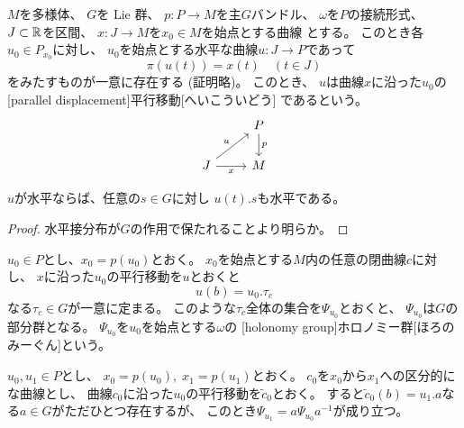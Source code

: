 \documentclass[report]{jlreq}
\begin{document}
\begin{definition}[平行移動]
    $M$を多様体、
    $G$を Lie 群、
    $p \colon P \to M$を主$G$バンドル、
    $\omega$を$P$の接続形式、
    $J \subset \mathbb{R}$を区間、
    $x \colon J \to M$を$x_0 \in M$を始点とする{\smooth}曲線
    とする。
    このとき各$u_0 \in P_{x_0}$に対し、
    $u_0$を始点とする水平な{\smooth}曲線$u \colon J \to P$であって
    \begin{equation}
        \pi(u(t)) = x(t) \quad (t \in J)
    \end{equation}
    をみたすものが一意に存在する (証明略)。
    このとき、
    $u$は曲線$x$に沿った$u_0$の
    [parallel displacement]{平行移動}[へいこういどう]
    であるという。
    \begin{equation}
        \begin{tikzcd}
            & P \ar{d}{p} \\
            J \ar{ru}{u} \ar{r}[swap]{x}
                & M
        \end{tikzcd}
    \end{equation}
\end{definition}

\begin{proposition}
    $u$が水平ならば、任意の$s \in G$に対し
    $u(t) . s$も水平である。
\end{proposition}

\begin{proof}
    水平接分布が$G$の作用で保たれることより明らか。
\end{proof}

\begin{definition}[主ファイバーバンドルの接続のホロノミー群]
    $u_0 \in P$とし、$x_0 = p(u_0)$とおく。
    $x_0$を始点とする$M$内の任意の閉曲線$c$に対し、
    $x$に沿った$u_0$の平行移動を$u$とおくと
    \begin{equation}
        u(b) = u_0 . \tau_c
    \end{equation}
    なる$\tau_c \in G$が一意に定まる。
    このような$\tau_c$全体の集合を$\Psi_{u_0}$とおくと、
    $\Psi_{u_0}$は$G$の部分群となる。
    $\Psi_{u_0}$を$u_0$を始点とする$\omega$の
    [holonomy group]{ホロノミー群}[ほろのみーぐん]という。
\end{definition}

\begin{proposition}[ホロノミー群の共役]
    $u_0, u_1 \in P$とし、
    $x_0 = p(u_0), \; x_1 = p(u_1)$とおく。
    $c_0$を$x_0$から$x_1$への区分的に{\smooth}な曲線とし、
    曲線$c_0$に沿った$u_0$の平行移動を$\widetilde{c}_0$とおく。
    すると$\widetilde{c}_0(b) = u_1 . a$なる$a \in G$がただひとつ存在するが、
    このとき$\Psi_{u_1} = a \Psi_{u_0} a^{-1}$が成り立つ。
\end{proposition}
\end{document}
